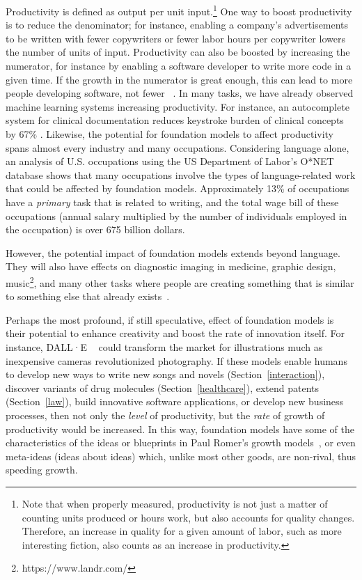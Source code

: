 Productivity is defined as output per unit input.\footnote{Note that when properly measured, productivity is not just a matter of counting units produced or hours work, but also accounts for quality changes. Therefore, an increase in quality for a given amount of labor, such as more interesting fiction, also counts as an increase in productivity.} One way to boost productivity is to reduce the denominator; for instance, enabling a company's advertisements to be written with fewer copywriters or fewer labor hours per copywriter lowers the number of units of input. Productivity can also be boosted by increasing the numerator, for instance by enabling a software developer to write more code in a given time. If the growth in the numerator is great enough, this can lead to more people developing software, not fewer ~\citep{david2015there}. In many tasks, we have already observed machine learning systems increasing productivity. For instance, an autocomplete system for clinical documentation reduces keystroke burden of clinical concepts by 67\% \citep{pmlr-v126-gopinath20a}. Likewise, the potential for foundation models to affect productivity spans almost every industry and many occupations. Considering language alone, an analysis of U.S. occupations using the US Department of Labor's O*NET database shows that many occupations involve the types of language-related work that could be affected by foundation models. Approximately 13\% of occupations have a \textit{primary} task that is related to writing, and the total wage bill of these occupations (annual salary multiplied by the number of individuals employed in the occupation) is over 675 billion dollars. 

However, the potential impact of foundation models extends beyond language. They will also have effects on diagnostic imaging in medicine, graphic design, music\footnote{https://www.landr.com/},
and many other tasks where people are creating something that is similar to something else that already exists~\citep{winkler2019derm,ramesh2021zeroshot}.

Perhaps the most profound, if still speculative, effect of foundation models is their potential to enhance creativity and boost the rate of innovation itself. For instance, DALL·E ~\citep{ramesh2021zeroshot} could transform the market for illustrations much as inexpensive cameras revolutionized photography. If these models enable humans to develop new ways to write new songs and novels (Section~\ref{interaction}), discover variants of drug molecules (Section~\ref{healthcare}), extend patents (Section~\ref{law}), build innovative software applications, or develop new business processes, then not only the \textit{level} of productivity, but the \textit{rate} of growth of productivity would be increased. In this way, foundation models have some of the characteristics of the ideas or blueprints in Paul Romer's growth models~\citep{romer1990endogenous}, or even meta-ideas (ideas about ideas) which, unlike most other goods, are non-rival, thus speeding growth.


